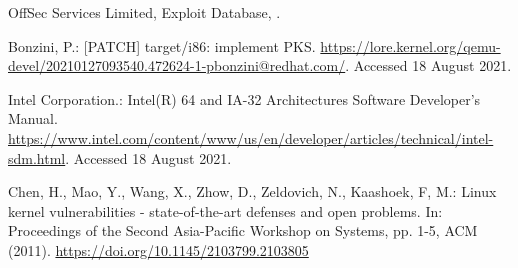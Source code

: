\documentclass[english,sigrecommended,JIP]{ipsj}
\begin{document}
\begin{thebibliography}{99}
OffSec Services Limited, Exploit Database,
   .

  
    Bonzini, P.: [PATCH] target/i86: implement PKS. \url{https://lore.kernel.org/qemu-devel/20210127093540.472624-1-pbonzini@redhat.com/}. Accessed 18 August 2021.

  Intel Corporation.: Intel(R) 64 and IA-32 Architectures Software Developer’s Manual. \url{https://www.intel.com/content/www/us/en/developer/articles/technical/intel-sdm.html}. Accessed 18 August 2021.



    Chen, H., Mao, Y., Wang, X., Zhow, D., Zeldovich, N., Kaashoek, F, M.: Linux kernel vulnerabilities - state-of-the-art defenses and open problems. In: Proceedings of the Second Asia-Pacific Workshop on Systems, pp. 1-5, ACM (2011). \url{https://doi.org/10.1145/2103799.2103805}    


\end{thebibliography}
\end{document}
